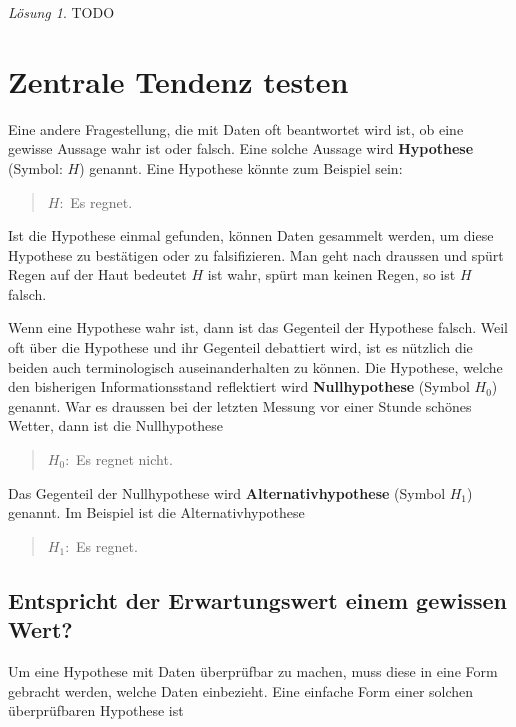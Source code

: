\documentclass[
]{book}
\theoremstyle{definition}
\theoremstyle{definition}
\theoremstyle{definition}
\theoremstyle{definition}
\theoremstyle{remark}
\newtheorem*{solution}{Lösung}
\begin{document}
\begin{solution}
TODO
\end{solution}

\chapter{Zentrale Tendenz testen}\label{zentrale-tendenz-testen}

Eine andere Fragestellung, die mit Daten oft beantwortet wird ist, ob eine gewisse Aussage wahr ist oder falsch. \label{customdef-hypothese}{Eine solche Aussage wird \textbf{Hypothese} (Symbol: \(H\)) genannt.} Eine Hypothese könnte zum Beispiel sein:

\begin{quote}
\(H:\) Es regnet.
\end{quote}

Ist die Hypothese einmal gefunden, können Daten gesammelt werden, um diese Hypothese zu bestätigen oder zu falsifizieren. Man geht nach draussen und spürt Regen auf der Haut bedeutet \(H\) ist wahr, spürt man keinen Regen, so ist \(H\) falsch.

Wenn eine Hypothese wahr ist, dann ist das Gegenteil der Hypothese falsch. Weil oft über die Hypothese und ihr Gegenteil debattiert wird, ist es nützlich die beiden auch terminologisch auseinanderhalten zu können. \label{customdef-nullhypothese}{Die Hypothese, welche den bisherigen Informationsstand reflektiert wird \textbf{Nullhypothese} (Symbol \(H_0\)) genannt.} War es draussen bei der letzten Messung vor einer Stunde schönes Wetter, dann ist die Nullhypothese

\begin{quote}
\(H_0:\) Es regnet nicht.
\end{quote}

\label{customdef-alternativhypothese}{Das Gegenteil der Nullhypothese wird \textbf{Alternativhypothese} (Symbol \(H_1\)) genannt.} Im Beispiel ist die Alternativhypothese

\begin{quote}
\(H_1:\) Es regnet.
\end{quote}

\section{Entspricht der Erwartungswert einem gewissen Wert?}\label{entspricht-der-erwartungswert-einem-gewissen-wert}

Um eine Hypothese mit Daten überprüfbar zu machen, muss diese in eine Form gebracht werden, welche Daten einbezieht. Eine einfache Form einer solchen überprüfbaren Hypothese ist
\end{document}
